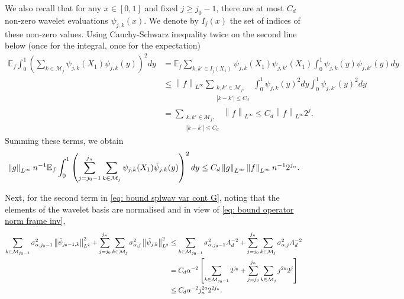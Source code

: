 \documentclass[preprint]{imsart}
\newcommand\norm[1]{\left\lVert#1\right\rVert}
\numberwithin{equation}{section}
\newcounter{cond}
\begin{document}
\begin{appendix}
We also recall that for any $x\in[0,1]$ and fixed $j\geq j_0-1$, there are at most $C_d$ non-zero wavelet evaluations $\psi_{j,k}(x)$. We denote by $I_j(x)$ the set of indices of these non-zero values. Using Cauchy-Schwarz inequality twice on the second line below (once for the integral, once for the expectation)
\begin{align*}
\mathbb{E}_f\int_0^1 \left(  \sum_{k\in\mathcal{M}_{j}} \psi_{j,k}(X_1)\psi_{j,k}(y) \right)^2dy&=\mathbb{E}_f \sum_{k,k'\in I_j(X_1)}\psi_{j,k}(X_1)\psi_{j,k'}(X_1)\int_0^1\psi_{j,k}(y)\psi_{j,k'}(y) dy \\
&\leq \norm{f}_{L^\infty} \sum_{\substack{k,k'\in\mathcal{M}_{j},\\ |k-k'|\leq C_d}} \int_0^1\psi_{j,k}(y)^2 dy\int_0^1\psi_{j,k'}(y)^2 dy \\
&= \sum_{\substack{k,k'\in\mathcal{M}_{j},\\ |k-k'|\leq C_d}} \norm{f}_{L^\infty} \leq C_d \norm{f}_{L^\infty} 2^j.
\end{align*}
Summing these terms, we obtain
\[\norm{g}_{L^\infty}n^{-1} \mathbb{E}_f\int_0^1 \left(  \sum_{j=j_0-1}^{j_n}\sum_{k\in\mathcal{M}_{j}} \psi_{j,k}(X_1)\Tilde{\psi}_{j,k}(y) \right)^2dy \leq C_d\norm{g}_{L^\infty}\norm{f}_{L^\infty}n^{-1} 2^{j_n}. \]


Next, for the second term in \eqref{eq: bound splwav var cont G}, noting that the elements of the wavelet basis are normalised and in view of \eqref{eq: bound operator norm frame inv}, 
\begin{align*}
    \sum_{k\in\mathcal{M}_{j_0-1}} \sigma_{\alpha,j_0-1}^2 \norm{\Tilde{\psi}_{j_0-1,k}}_{L^2}^2 + \sum_{j=j_0}^{j_n}\sum_{k\in\mathcal{M}_{j}} \sigma_{\alpha,j}^2\norm{\Tilde{\psi}_{j,k}}_{L^2}^2 &\leq \sum_{k\in\mathcal{M}_{j_0-1}} \sigma_{\alpha,j_0-1}^2 A_d^{-2} + \sum_{j=j_0}^{j_n}\sum_{k\in\mathcal{M}_{j}} \sigma_{\alpha,j}^2 A_d^{-2} \\
    &= C_d \alpha^{-2} \left[ \sum_{k\in\mathcal{M}_{j_0-1}} 2^{j_0} + \sum_{j=j_0}^{j_n}\sum_{k\in\mathcal{M}_{j}} j^{2a}2^{j}\right]\\
    &\leq C_d \alpha^{-2} j_n^{2a}2^{2j_n}.
\end{align*}



\end{appendix}
\end{document}
